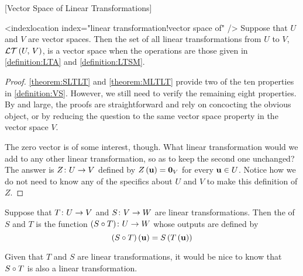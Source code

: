 \documentclass{ximera}
\begin{document}
\begin{theorem}
\label{theorem:VSLT}
[Vector Space of Linear Transformations]

<indexlocation index="linear transformation!vector space of" />
Suppose that $U$ and $V$ are vector spaces.  Then the set of all linear transformations from $U$ to $V$, $\mathcal{LT}\left(U,\,V\right)$, is a vector space when the operations are those given in \ref{definition:LTA} and \ref{definition:LTSM}.





\begin{proof}
\ref{theorem:SLTLT} and \ref{theorem:MLTLT} provide two of the ten properties in \ref{definition:VS}.  However, we still need to verify the remaining eight properties.  By and large, the proofs are straightforward and rely on concocting the obvious object, or by reducing the question to the same vector space property in the vector space $V$.



The zero vector is of some interest, though. What linear transformation would we add to any other linear transformation, so as to keep the second one unchanged?  The answer is $Z\colon U\rightarrow V$ defined by $Z\left(\mathbf{u}\right)=\mathbf{0}_V$ for every $\mathbf{u}\in U$.  Notice how we do not need to know any of the specifics about $U$ and $V$ to make this definition of $Z$.



\end{proof}
\end{theorem}

\begin{definition}
Suppose that $T\colon U\rightarrow V$ and $S\colon V\rightarrow W$ are linear transformations.  Then the  of $S$ and $T$ is the function $({S}\circ{T})\colon U\rightarrow W$ whose outputs are defined by
\[
({S}\circ{T})\left(\mathbf{u}\right)=S\left(T\left(\mathbf{u}\right)\right)
\]

\end{definition}

Given that $T$ and $S$ are linear transformations, it would be nice to know that ${S}\circ{T}$ is also a linear transformation.
\end{document}

